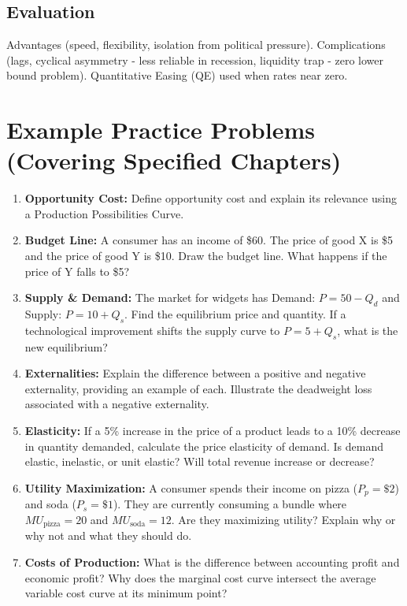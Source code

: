 \documentclass{article}
\begin{document}
\subsection*{Evaluation}
Advantages (speed, flexibility, isolation from political pressure). Complications (lags, cyclical asymmetry - less reliable in recession, liquidity trap - zero lower bound problem). Quantitative Easing (QE) used when rates near zero.

\newpage %

\section*{Example Practice Problems (Covering Specified Chapters)}
\begin{enumerate}[label=\arabic*.]
    \item \textbf{Opportunity Cost:} Define opportunity cost and explain its relevance using a Production Possibilities Curve.
    \item \textbf{Budget Line:} A consumer has an income of \$60. The price of good X is \$5 and the price of good Y is \$10. Draw the budget line. What happens if the price of Y falls to \$5?
    \item \textbf{Supply \& Demand:} The market for widgets has Demand: $P = 50 - Q_d$ and Supply: $P = 10 + Q_s$. Find the equilibrium price and quantity. If a technological improvement shifts the supply curve to $P = 5 + Q_s$, what is the new equilibrium?
    \item \textbf{Externalities:} Explain the difference between a positive and negative externality, providing an example of each. Illustrate the deadweight loss associated with a negative externality.
    \item \textbf{Elasticity:} If a 5\% increase in the price of a product leads to a 10\% decrease in quantity demanded, calculate the price elasticity of demand. Is demand elastic, inelastic, or unit elastic? Will total revenue increase or decrease?
    \item \textbf{Utility Maximization:} A consumer spends their income on pizza ($P_p=\$2$) and soda ($P_s=\$1$). They are currently consuming a bundle where $MU_{\text{pizza}} = 20$ and $MU_{\text{soda}} = 12$. Are they maximizing utility? Explain why or why not and what they should do.
    \item \textbf{Costs of Production:} What is the difference between accounting profit and economic profit? Why does the marginal cost curve intersect the average variable cost curve at its minimum point?

\end{enumerate}
\end{document}
